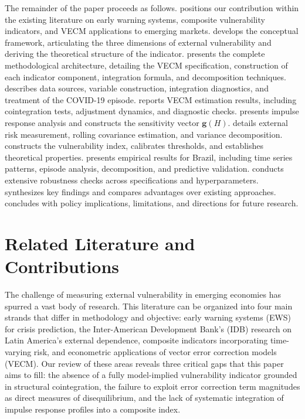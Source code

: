 \documentclass[12pt,a4paper]{article}
\numberwithin{equation}{section}
\theoremstyle{definition}
\theoremstyle{remark}
\newcommand{\vect}[1]{\boldsymbol{#1}}
\begin{document}
The remainder of the paper proceeds as follows.  positions our contribution within the existing literature on early warning systems, composite vulnerability indicators, and VECM applications to emerging markets.  develops the conceptual framework, articulating the three dimensions of external vulnerability and deriving the theoretical structure of the indicator.  presents the complete methodological architecture, detailing the VECM specification, construction of each indicator component, integration formula, and decomposition techniques.  describes data sources, variable construction, integration diagnostics, and treatment of the COVID-19 episode.  reports VECM estimation results, including cointegration tests, adjustment dynamics, and diagnostic checks.  presents impulse response analysis and constructs the sensitivity vector $\vect{g}(H)$.  details external risk measurement, rolling covariance estimation, and variance decomposition.  constructs the vulnerability index, calibrates thresholds, and establishes theoretical properties.  presents empirical results for Brazil, including time series patterns, episode analysis, decomposition, and predictive validation.  conducts extensive robustness checks across specifications and hyperparameters.  synthesizes key findings and compares advantages over existing approaches.  concludes with policy implications, limitations, and directions for future research.


\section{Related Literature and Contributions}
\label{sec:literature}

The challenge of measuring external vulnerability in emerging economies has spurred a vast body of research. This literature can be organized into four main strands that differ in methodology and objective: early warning systems (EWS) for crisis prediction, the Inter-American Development Bank's (IDB) research on Latin America's external dependence, composite indicators incorporating time-varying risk, and econometric applications of vector error correction models (VECM). Our review of these areas reveals three critical gaps that this paper aims to fill: the absence of a fully model-implied vulnerability indicator grounded in structural cointegration, the failure to exploit error correction term magnitudes as direct measures of disequilibrium, and the lack of systematic integration of impulse response profiles into a composite index.
\end{document}
